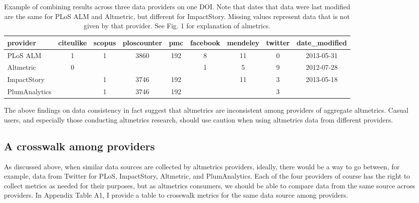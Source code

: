 \documentclass[letterpaper,superscriptaddress,showkeys,longbibliography]{revtex4-1}\usepackage{graphicx, color}
\begin{document}
\begin{table}[ht]
\centering
\caption{Example of combining results across three data providers on one DOI. Note that dates that data were last modified are the same for PLoS ALM and Altmetric, but different for ImpactStory. Missing values represent data that is not given by that provider. See Fig. 1 for explanation of almetrics.} 
\begin{tabular}{l|cccccccc}
  \hline
provider & citeulike & scopus & ploscounter & pmc & facebook & mendeley & twitter & date\_modified \\ 
  \hline
PLoS ALM & 1 & 1 & 3860 & 192 & 8 & 11 & 0 & 2013-05-31 \\ 
  Altmetric & 0 &  &  &  & 1 & 5 & 9 & 2012-07-28 \\ 
  ImpactStory &  & 1 & 3746 & 192 &  & 11 & 3 & 2013-05-18 \\ 
  PlumAnalytics &  & 1 & 3746 & 192 &  &  & 3 &  \\ 
   \hline
\end{tabular}
\end{table}




The above findings on data consistency in fact suggest that altmetrics are inconsistent among providers of aggregate altmetrics. Casual users, and especially those conducting altmetrics research, should use caution when using altmetrics data from different providers.  

\subsection*{A crosswalk among providers}

As discussed above, when similar data sources are collected by altmetrics providers, ideally, there would be a way to go between, for example, data from Twitter for PLoS, ImpactStory, Altmetric, and PlumAnalytics. Each of the four providers of course has the right to collect metrics as needed for their purposes, but as altmetrics consumers, we should be able to compare data from the same source across providers. In Appendix Table A1, I provide a table to crosswalk metrics for the same data source among providers.
\end{document}
